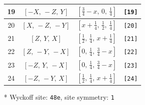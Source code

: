 \documentclass[fleqn,8pt]{jsarticle}
\begin{document}
\begin{longtable}{cccc}
19 & $\left[ - X,\, - Z,\, Y \right]$ & $\left[ \frac{3}{4} - x,\, 0,\, \frac{1}{4} \right]$ & {\tt [19]} \\ \hline
20 & $\left[ X,\, - Z,\, - Y \right]$ & $\left[ x + \frac{1}{4},\, \frac{1}{2},\, \frac{1}{4} \right]$ & {\tt [20]} \\ \hline
21 & $\left[ Z,\, Y,\, X \right]$ & $\left[ \frac{1}{2},\, \frac{1}{4},\, x + \frac{1}{4} \right]$ & {\tt [21]} \\ \hline
22 & $\left[ Z,\, - Y,\, - X \right]$ & $\left[ 0,\, \frac{1}{4},\, \frac{3}{4} - x \right]$ & {\tt [22]} \\ \hline
23 & $\left[ - Z,\, Y,\, - X \right]$ & $\left[ 0,\, \frac{1}{4},\, \frac{3}{4} - x \right]$ & {\tt [23]} \\ \hline
24 & $\left[ - Z,\, - Y,\, X \right]$ & $\left[ \frac{1}{2},\, \frac{1}{4},\, x + \frac{1}{4} \right]$ & {\tt [24]} \\
\end{longtable}
* Wyckoff site: {\tt 48e}, site symmetry: {\tt 1}
\renewcommand{\arraystretch}{1.2}
\end{document}
